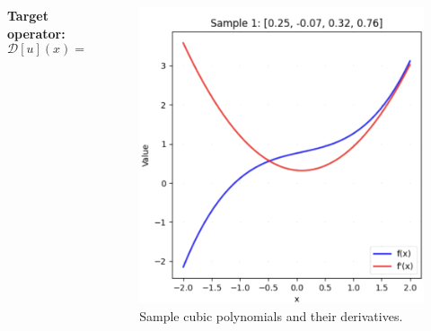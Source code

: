 \documentclass[notes]{beamer}
\begin{document}
\begin{frame}
\begin{columns}[T]
\begin{column}{0.5\textwidth}
        \textbf{Target operator:}
        \begin{equation*}
        \mathcal{D}[u](x) = 3ax^2 + 2bx + c
        \end{equation*}
    \end{column}
    \begin{column}{0.5\textwidth}
        \begin{figure}[ht]
            \centering
            \includegraphics[width=\linewidth]{figs/polynomial_samples.png}
            \caption*{Sample cubic polynomials and their derivatives.}
        \end{figure}
    \end{column}
\end{columns}

\end{frame}
\end{document}
